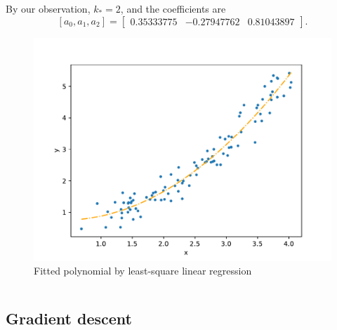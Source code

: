 \documentclass[12pt]{article}
\begin{document}
By our observation, \(k_*=2\), and the coefficients are
\[ [a_0, a_1, a_2] = \begin{bmatrix} 0.35333775 & -0.27947762 & 0.81043897\end{bmatrix}. \]
\begin{figure}[htbp]
    \includegraphics{Homework1/ex1c.pdf}
    \caption{Fitted polynomial by least-square linear regression}
\end{figure}
\inputminted[]{python}{./Homework1/ex1.py}

\subsection{Gradient descent}
\end{document}

